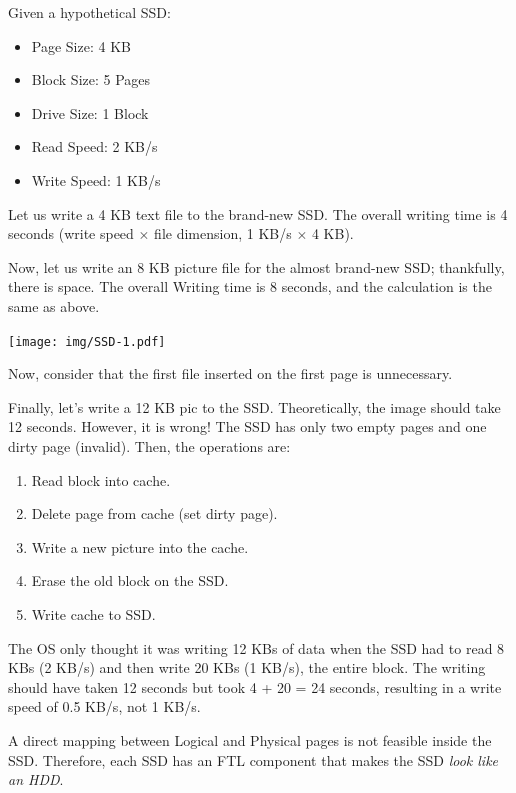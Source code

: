 \begin{examplebox}
    Given a hypothetical SSD:
    \begin{itemize}
        \item Page Size: 4 KB
        \item Block Size: 5 Pages
        \item Drive Size: 1 Block
        \item Read Speed: 2 KB/s
        \item Write Speed: 1 KB/s
    \end{itemize}
    Let us write a 4 KB text file to the brand-new SSD. The overall writing time is 4 seconds (write speed $\times$ file dimension, 1 KB/s $\times$ 4 KB).

    \newpage

    Now, let us write an 8 KB picture file for the almost brand-new SSD; thankfully, there is space. The overall Writing time is 8 seconds, and the calculation is the same as above.

    \begin{center}
        \texttt{[image: img/SSD-1.pdf]}
    \end{center}
    Now, consider that the first file inserted on the first page is unnecessary.

    \highspace
    Finally, let's write a 12 KB pic to the SSD. Theoretically, the image should take 12 seconds. However, it is wrong! The SSD has only two empty pages and one dirty page (invalid). Then, the operations are:
    \begin{enumerate}
        \item Read block into cache.
        \item Delete page from cache (set dirty page).
        \item Write a new picture into the cache.
        \item Erase the old block on the SSD.
        \item Write cache to SSD.
    \end{enumerate}
    The OS only thought it was writing 12 KBs of data when the SSD had to read 8 KBs (2 KB/s) and then write 20 KBs (1 KB/s), the entire block. The writing should have taken 12 seconds but took 4 + 20 = 24 seconds, resulting in a write speed of 0.5 KB/s, not 1 KB/s.
\end{examplebox}

\noindent
A direct mapping between Logical and Physical pages is not feasible inside the SSD. Therefore, each SSD has an FTL component that makes the SSD \emph{look like an HDD}.

